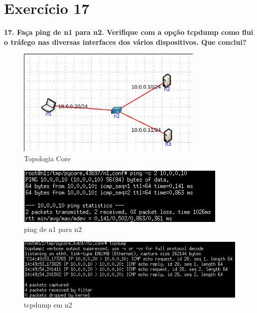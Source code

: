 \documentclass[a4paper]{report}
\begin{document}
\section{Exercício 17}
\textbf{17. Faça ping de n1 para n2. Verifique com a opção tcpdump como flui o
tráfego nas diversas interfaces dos vários dispositivos. Que conclui?}
\begin{figure}[H]
    \centering 
    \includegraphics[width=0.8\textwidth]{images/ex17topologiacore.png}
    \caption{Topologia Core}
    \label{fig:ex17topologiacore}
\end{figure}

\begin{figure}[H]
    \centering 
    \includegraphics[width=\textwidth]{images/ex17ping.png}
    \caption{ping de n1 para n2}
    \label{fig:ex17ping}
\end{figure}

\begin{figure}[H]
    \centering 
    \includegraphics[width=\textwidth]{images/ex17tcpdumpn2.png}
    \caption{tcpdump em n2}
    \label{fig:ex17tcpdumpn2}
\end{figure}
\end{document}
